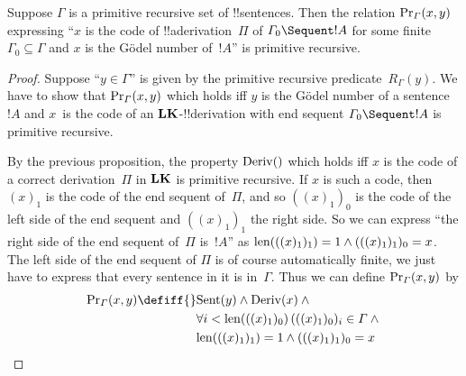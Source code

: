 \documentclass[../../include/open-logic-section]{subfiles}
\begin{document}
\begin{prop}
Suppose $\Gamma$ is a primitive recursive set of !!{sentence}s.  Then
the relation $\mathrm{Pr}_\Gamma(x, y)$ expressing ``$x$ is the code of
!!a{derivation}~$\Pi$ of $\Gamma_0 \Sequent !A$ for some finite
$\Gamma_0 \subseteq \Gamma$ and $x$ is the G\"odel number of~$!A$'' is
primitive recursive.
\end{prop}

\begin{proof}
Suppose ``$y \in \Gamma$'' is given by the primitive recursive
predicate~$R_\Gamma(y)$. We have to show that $\mathrm{Pr}_\Gamma(x, y)$
which holds iff $y$ is the G\"odel number of a sentence~$!A$ and
$x$~is the code of an $\mathbf{LK}$-!!{derivation} with end sequent
$\Gamma_0 \Sequent !A$ is primitive recursive.

By the previous proposition, the property $\mathrm{Deriv}()$ which holds
iff $x$ is the code of a correct derivation~$\Pi$ in $\mathbf{LK}$ is
primitive recursive.  If $x$ is such a code, then $(x)_1$ is the code
of the end sequent of~$\Pi$, and so $((x)_1)_0$ is the code of the
left side of the end sequent and $((x)_1)_1$ the right side. So we can
express ``the right side of the end sequent of~$\Pi$ is~$!A$'' as
$\mathrm{len}(((x)_1)_1) = 1 \land (((x)_1)_1)_0 = x$.  The left side of the
end sequent of $\Pi$ is of course automatically finite, we just have
to express that every sentence in it is in~$\Gamma$.  Thus we can
define $\mathrm{Pr}_\Gamma(x, y)$ by
\begin{align*}
\fn{Pr}_\Gamma(x, y) \defiff {}&
\fn{Sent}(y) \land \fn{Deriv}(x) \land {} \\
& \lforall[i <
  \len{((x)_1)_0}][(((x)_1)_0)_i \in \Gamma] \land {}\\
& \len{((x)_1)_1} = 1 \land (((x)_1)_1)_0 = x
\end{align*}
\end{proof}
\end{document}
